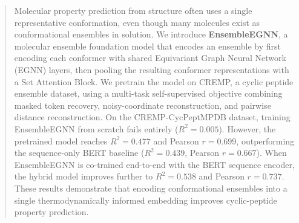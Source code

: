 \documentclass{article}
\begin{document}

\printAffiliationsAndNotice{}

\begin{abstract}
Molecular property prediction from structure often uses a single representative conformation, even though many molecules exist as conformational ensembles in solution. We introduce \textbf{EnsembleEGNN}, a molecular ensemble foundation model that encodes an ensemble by first encoding each conformer with shared Equivariant Graph Neural Network (EGNN) layers, then pooling the resulting conformer representations with a Set Attention Block. We pretrain the model on CREMP, a cyclic peptide ensemble dataset, using a multi-task self-supervised objective combining masked token recovery, noisy-coordinate reconstruction, and pairwise distance reconstruction. On the CREMP-CycPeptMPDB dataset, training EnsembleEGNN from scratch fails entirely ($R^2=0.005$). However, the pretrained model reaches $R^2=0.477$ and Pearson $r=0.699$, outperforming the sequence-only BERT baseline ($R^2=0.439$, Pearson $r=0.667$). When EnsembleEGNN is co-trained end-to-end with the BERT sequence encoder, the hybrid model improves further to $R^2=0.538$ and Pearson $r=0.737$. These results demonstrate that encoding conformational ensembles into a single thermodynamically informed embedding improves cyclic-peptide property prediction.
\end{abstract}
\end{document}

